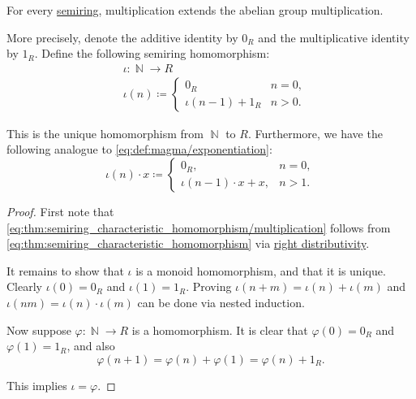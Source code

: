 \begin{proposition}\label{thm:semiring_characteristic_homomorphism}
  For every \hyperref[def:semiring/identity]{semiring}, multiplication extends the abelian group multiplication.

  More precisely, denote the additive identity by \( 0_R \) and the multiplicative identity by \( 1_R \). Define the following semiring homomorphism:
  \begin{equation}\label{eq:thm:semiring_characteristic_homomorphism}
    \begin{aligned}
      &\iota: \BbbN \to R \\
      &\iota(n) \coloneqq \begin{cases}
        0_R                &n = 0, \\
        \iota(n - 1) + 1_R &n > 0.
      \end{cases}
    \end{aligned}
  \end{equation}

  This is the unique homomorphism from \( \BbbN \) to \( R \). Furthermore, we have the following analogue to \eqref{eq:def:magma/exponentiation}:
  \begin{equation}\label{eq:thm:semiring_characteristic_homomorphism/multiplication}
    \iota(n) \cdot x \coloneqq \begin{cases}
      0_R,                      &n = 0, \\
      \iota(n - 1) \cdot x + x, &n > 1.
    \end{cases}
  \end{equation}
\end{proposition}
\begin{proof}
  First note that \eqref{eq:thm:semiring_characteristic_homomorphism/multiplication} follows from \eqref{eq:thm:semiring_characteristic_homomorphism} via \hyperref[def:semiring/right_distributivity]{right distributivity}.

  It remains to show that \( \iota \) is a monoid homomorphism, and that it is unique. Clearly \( \iota(0) = 0_R \) and \( \iota(1) = 1_R \). Proving \( \iota(n + m) = \iota(n) + \iota(m) \) and \( \iota(nm) = \iota(n) \cdot \iota(m) \) can be done via nested induction.

  Now suppose \( \varphi: \BbbN \to R \) is a homomorphism. It is clear that \( \varphi(0) = 0_R \) and \( \varphi(1) = 1_R \), and also
  \begin{equation*}
    \varphi(n + 1) = \varphi(n) + \varphi(1) = \varphi(n) + 1_R.
  \end{equation*}

  This implies \( \iota = \varphi \).
\end{proof}

